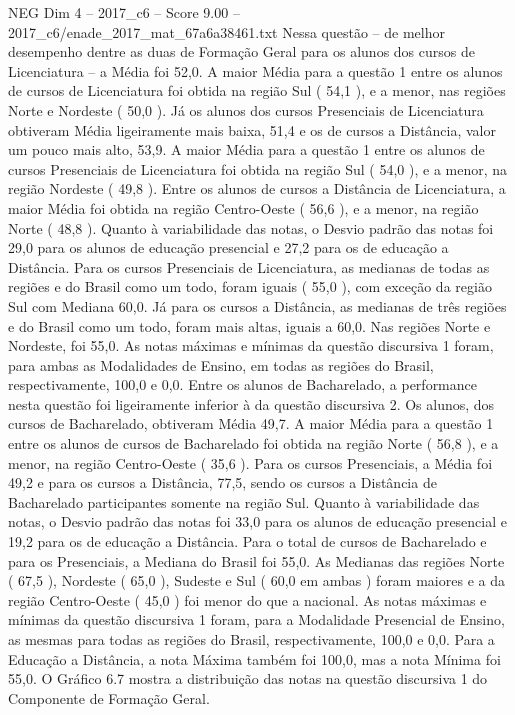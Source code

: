 \begin{textsample}{NEG Dim 4 – 2017\_c6 – Score 9.00 – 2017\_c6/enade\_2017\_mat\_67a6a38461.txt}
Nessa questão – de melhor desempenho dentre as duas de Formação Geral para os alunos dos cursos de Licenciatura – a Média foi 52,0.
A maior Média para a questão 1 entre os alunos de cursos de Licenciatura foi obtida na região Sul ( 54,1 ), e a menor, nas regiões Norte e Nordeste ( 50,0 ).
Já os alunos dos cursos Presenciais de Licenciatura obtiveram Média ligeiramente mais baixa, 51,4 e os de cursos a Distância, valor um pouco mais alto, 53,9.
A maior Média para a questão 1 entre os alunos de cursos Presenciais de Licenciatura foi obtida na região Sul ( 54,0 ), e a menor, na região Nordeste ( 49,8 ).
Entre os alunos de cursos a Distância de Licenciatura, a maior Média foi obtida na região Centro-Oeste ( 56,6 ), e a menor, na região Norte ( 48,8 ).
Quanto à variabilidade das notas, o Desvio padrão das notas foi 29,0 para os alunos de educação presencial e 27,2 para os de educação a Distância.
Para os cursos Presenciais de Licenciatura, as medianas de todas as regiões e do Brasil como um todo, foram iguais ( 55,0 ), com exceção da região Sul com Mediana 60,0.
Já para os cursos a Distância, as medianas de três regiões e do Brasil como um todo, foram mais altas, iguais a 60,0.
Nas regiões Norte e Nordeste, foi 55,0.
As notas máximas e mínimas da questão discursiva 1 foram, para ambas as Modalidades de Ensino, em todas as regiões do Brasil, respectivamente, 100,0 e 0,0.
Entre os alunos de Bacharelado, a performance nesta questão foi ligeiramente inferior à da questão discursiva 2.
Os alunos, dos cursos de Bacharelado, obtiveram Média 49,7.
A maior Média para a questão 1 entre os alunos de cursos de Bacharelado foi obtida na região Norte ( 56,8 ), e a menor, na região Centro-Oeste ( 35,6 ).
Para os cursos Presenciais, a Média foi 49,2 e para os cursos a Distância, 77,5, sendo os cursos a Distância de Bacharelado participantes somente na região Sul.
Quanto à variabilidade das notas, o Desvio padrão das notas foi 33,0 para os alunos de educação presencial e 19,2 para os de educação a Distância.
Para o total de cursos de Bacharelado e para os Presenciais, a Mediana do Brasil foi 55,0.
As Medianas das regiões Norte ( 67,5 ), Nordeste ( 65,0 ), Sudeste e Sul ( 60,0 em ambas ) foram maiores e a da região Centro-Oeste ( 45,0 ) foi menor do que a nacional.
As notas máximas e mínimas da questão discursiva 1 foram, para a Modalidade Presencial de Ensino, as mesmas para todas as regiões do Brasil, respectivamente, 100,0 e 0,0.
Para a Educação a Distância, a nota Máxima também foi 100,0, mas a nota Mínima foi 55,0.
O Gráfico 6.7 mostra a distribuição das notas na questão discursiva 1 do Componente de Formação Geral.

\end{textsample}
